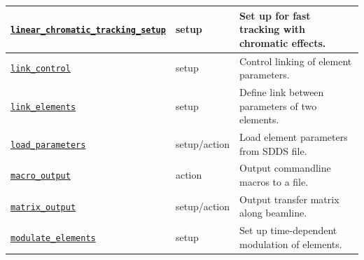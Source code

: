 \documentclass[11pt]{article}
\begin{document}
\begin{longtable}{|p{2.75in}|p{0.75in}|p{2.75in}|}
\hyperref[subsec:linearchromatictrackingsetup]{\tt linear\_chromatic\_tracking\_setup} & setup & Set up for fast tracking with chromatic effects. \\ \hline
\hyperref[subsec:linkcontrol]{\tt link\_control} & setup & Control linking of element parameters. \\ \hline
\hyperref[subsec:linkelements]{\tt link\_elements} & setup & Define link between parameters of two elements. \\ \hline
\hyperref[subsec:loadparameters]{\tt load\_parameters} & setup/action & Load element parameters from SDDS file. \\ \hline
\hyperref[subsec:macrooutput]{\tt macro\_output} & action & Output commandline macros to a file. \\ \hline
\hyperref[subsec:matrixoutput]{\tt matrix\_output} & setup/action & Output transfer matrix along beamline. \\ \hline
\hyperref[subsec:modulateelements]{\tt modulate\_elements} & setup & Set up time-dependent modulation of elements. \\ \hline


\end{longtable}
\end{document}
